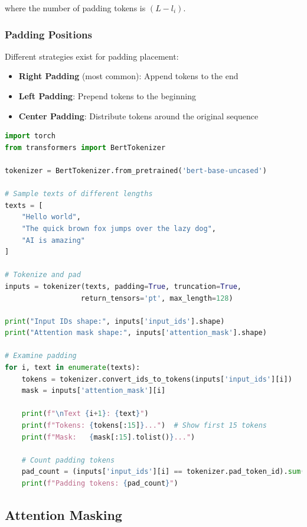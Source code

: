 where the number of padding tokens is $(L - l_i)$.

\subsubsection{Padding Positions}
Different strategies exist for padding placement:

\begin{itemize}
\item \textbf{Right Padding} (most common): Append \pad{} tokens to the end
\item \textbf{Left Padding}: Prepend \pad{} tokens to the beginning  
\item \textbf{Center Padding}: Distribute \pad{} tokens around the original sequence
\end{itemize}

\begin{example}
\begin{lstlisting}[language=Python]
import torch
from transformers import BertTokenizer

tokenizer = BertTokenizer.from_pretrained('bert-base-uncased')

# Sample texts of different lengths
texts = [
    "Hello world",
    "The quick brown fox jumps over the lazy dog",
    "AI is amazing"
]

# Tokenize and pad
inputs = tokenizer(texts, padding=True, truncation=True, 
                  return_tensors='pt', max_length=128)

print("Input IDs shape:", inputs['input_ids'].shape)
print("Attention mask shape:", inputs['attention_mask'].shape)

# Examine padding
for i, text in enumerate(texts):
    tokens = tokenizer.convert_ids_to_tokens(inputs['input_ids'][i])
    mask = inputs['attention_mask'][i]
    
    print(f"\nText {i+1}: {text}")
    print(f"Tokens: {tokens[:15]}...")  # Show first 15 tokens
    print(f"Mask:   {mask[:15].tolist()}...")
    
    # Count padding tokens
    pad_count = (inputs['input_ids'][i] == tokenizer.pad_token_id).sum()
    print(f"Padding tokens: {pad_count}")
\end{lstlisting}
\end{example}

\subsection{Attention Masking}

